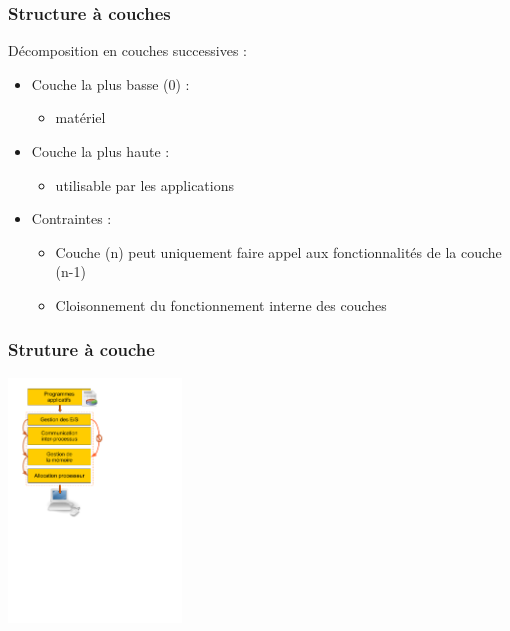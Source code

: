 \begin{frame}
\frametitle{Structure à couches}
Décomposition en couches successives :
\begin{itemize}
\item Couche la plus basse (0) : 
\begin{itemize}
\item matériel
\end{itemize}

\item Couche la plus haute :
\begin{itemize}
\item utilisable par les applications
\end{itemize}

\item Contraintes :
\begin{itemize}
\item Couche (n) peut uniquement faire appel aux fonctionnalités de la couche (n-1)
\item Cloisonnement du fonctionnement interne des couches
\end{itemize}
\end{itemize}
\end{frame}


\begin{frame}
\frametitle{Struture à couche}
\begin{center}
\includegraphics[height=6.5cm]{../illustration/modele_couche.pdf}
\end{center}
\end{frame}


